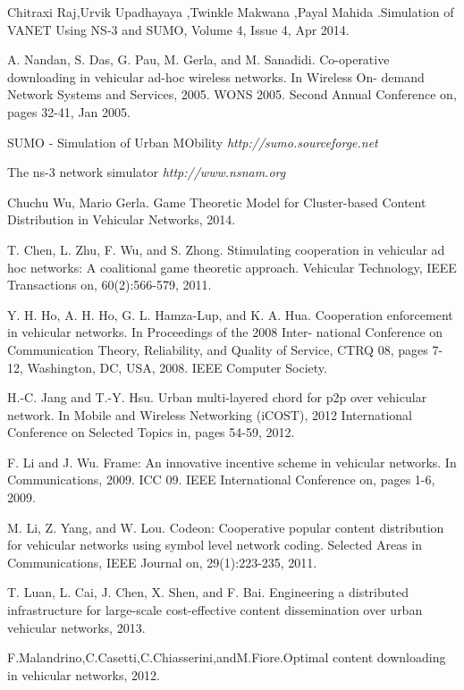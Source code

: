 \documentclass{acm_proc_article-sp}
\begin{document}
\begin{thebibliography}{1}

 Chitraxi Raj,Urvik Upadhayaya ,Twinkle Makwana ,Payal Mahida .Simulation of VANET Using NS-3 and SUMO, Volume 4, Issue 4, Apr 2014.

A. Nandan, S. Das, G. Pau, M. Gerla, and M. Sanadidi. Co-operative downloading in vehicular ad-hoc wireless networks. In Wireless On- demand Network Systems and Services, 2005. WONS 2005. Second Annual Conference on, pages 32-41, Jan 2005.

  SUMO - Simulation of Urban MObility {\em http://sumo.sourceforge.net}

 The ns-3 network simulator {\em http://www.nsnam.org}

 Chuchu Wu, Mario Gerla. Game Theoretic Model for Cluster-based Content Distribution in Vehicular Networks, 2014.

 T. Chen, L. Zhu, F. Wu, and S. Zhong. Stimulating cooperation in vehicular ad hoc networks: A coalitional game theoretic approach. Vehicular Technology, IEEE Transactions on, 60(2):566-579, 2011.

 Y. H. Ho, A. H. Ho, G. L. Hamza-Lup, and K. A. Hua. Cooperation enforcement in vehicular networks. In Proceedings of the 2008 Inter- national Conference on Communication Theory, Reliability, and Quality of Service, CTRQ 08, pages 7-12, Washington, DC, USA, 2008. IEEE Computer Society.

 H.-C. Jang and T.-Y. Hsu. Urban multi-layered chord for p2p over vehicular network. In Mobile and Wireless Networking (iCOST), 2012 International Conference on Selected Topics in, pages 54-59, 2012.

 F. Li and J. Wu. Frame: An innovative incentive scheme in vehicular networks. In Communications, 2009. ICC 09. IEEE International Conference on, pages 1-6, 2009.

 M. Li, Z. Yang, and W. Lou. Codeon: Cooperative popular content distribution for vehicular networks using symbol level network coding. Selected Areas in Communications, IEEE Journal on, 29(1):223-235, 2011.

 T. Luan, L. Cai, J. Chen, X. Shen, and F. Bai. Engineering a distributed infrastructure for large-scale cost-effective content dissemination over urban vehicular networks, 2013.

F.Malandrino,C.Casetti,C.Chiasserini,andM.Fiore.Optimal content downloading in vehicular networks, 2012.


\end{thebibliography}
\end{document}
